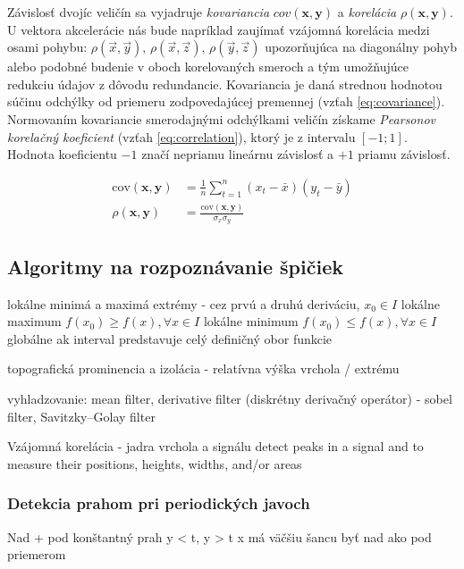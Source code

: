 Závislosť dvojíc veličín sa vyjadruje \emph{kovariancia} $cov(\mathbf{x}, \mathbf{y})$ a \emph{korelácia} 
$\rho(\mathbf{x}, \mathbf{y})$. U vektora akcelerácie nás bude napríklad zaujímať vzájomná korelácia medzi 
osami pohybu: $\rho(\vec{x},\vec{y}),\, \rho(\vec{x},\vec{z}),\, \rho(\vec{y},\vec{z})$ upozorňujúca na diagonálny 
pohyb alebo podobné budenie v oboch korelovaných smeroch a tým umožňujúce redukciu údajov z dôvodu redundancie.
Kovariancia je daná strednou hodnotou súčinu odchýlky od priemeru zodpovedajúcej premennej (vzťah \ref{eq:covariance}). 
Normovaním kovariancie smerodajnými odchýlkami veličín získame \emph{Pearsonov korelačný koeficient}
(vzťah \ref{eq:correlation}), ktorý je z intervalu $[-1; 1]$.  Hodnota koeficientu $-1$ značí nepriamu lineárnu závislosť
a $+1$ priamu závislosť. 
\begin{ceqn}\begin{align}
\mathrm{cov}(\mathbf{x}, \mathbf{y}) &= \frac{1}{n} \sum_{t=1}^{n}{(x_t - \bar{x})(y_t - \bar{y})} \label{eq:covariance} \\
\rho(\mathbf{x}, \mathbf{y}) &= \frac{\mathrm{cov}(\mathbf{x}, \mathbf{y})}{\sigma_x \sigma_y} \label{eq:correlation}
\end{align}\end{ceqn}

\subsection{Algoritmy na rozpoznávanie špičiek}
\label{peak-detection}
lokálne minimá a maximá extrémy - cez prvú a druhú deriváciu, 
\cite{survey-peaks-valleys}
$x_0 \in I$
lokálne maximum $f(x_0) \geq f(x), \forall x \in I$ 
lokálne minimum  $f(x_0) \leq f(x), \forall x \in I$
globálne ak interval predstavuje celý definičný obor funkcie

topografická prominencia a izolácia - relatívna výška vrchola / extrému

vyhladzovanie: mean filter, derivative filter (diskrétny derivačný operátor) - sobel filter, Savitzky–Golay filter
\cite{spectrometry-peak-detection}

Vzájomná korelácia - jadra vrchola a signálu
detect peaks in a signal and to measure their positions, heights, widths, and/or areas


\subsubsection{Detekcia prahom pri periodických javoch}
Nad + pod konštantný prah y < t, y > t
x má väčšiu šancu byť nad ako pod priemerom

